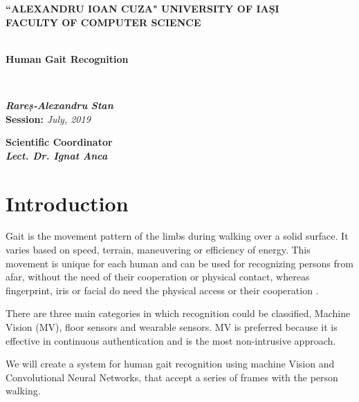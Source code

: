 \documentclass[12pt]{article}
\theoremstyle{definition}
\begin{document}
	\begin{titlepage}
		\begin{center}
			\textbf{``ALEXANDRU IOAN CUZA" UNIVERSITY OF IAȘI}
			\
			\\
			\textbf{FACULTY OF COMPUTER SCIENCE}\\
			\vspace{6cm}
			\
			\\
			\begin{huge}
				\textbf{Human Gait Recognition}
			\end{huge}
			\\
			\begin{large}
				\vspace{3cm}
				\textit{\textbf{Rareș-Alexandru Stan}}
				\\
				\vspace{3cm}
				\textbf{Session:} \textit{July, 2019}
				\\
			\end{large}
			\vspace{3cm}
			\textbf{Scientific Coordinator}
			\
			\\
			\textit{\textbf{Lect. Dr. Ignat Anca}	}
		\end{center}
	\end{titlepage}
	\newpage
	\tableofcontents
	\newpage

	\section{Introduction}
	\vspace{1cm}

	Gait is the movement pattern of the limbs during walking over a solid surface. It varies based on speed, terrain, maneuvering or efficiency of energy. This movement is unique for each human and can be used for recognizing persons from afar, without the need of their cooperation or physical contact, whereas fingerprint, iris or facial do need the physical access or their cooperation \cite{biometrics-comparison}.

	There are three main categories in which recognition could be classified, Machine Vision (MV), floor sensors and wearable sensors. MV is preferred because it is effective in continuous authentication and is the most non-intrusive approach.

	We will create a system for human gait recognition using machine Vision and Convolutional Neural Networks, that accept a series of frames with the person walking.
\end{document}
